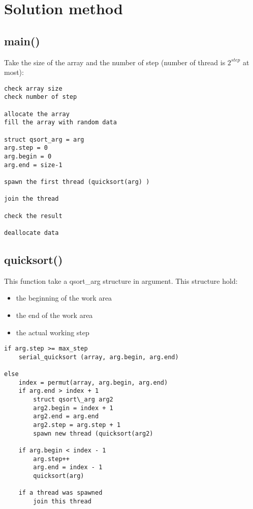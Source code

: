 \chapter{Solution method}

\section{main()}

Take the size of the array and the number of step (number of thread is $2^{step}$ at most):

\begin{verbatim}
check array size
check number of step

allocate the array
fill the array with random data

struct qsort_arg = arg
arg.step = 0
arg.begin = 0
arg.end = size-1

spawn the first thread (quicksort(arg) )

join the thread

check the result

deallocate data
\end{verbatim}

\section{quicksort()}

This function take a qsort\_arg structure in argument. This structure hold:
\begin{itemize}
  \item the beginning of the work area
  \item the end of the work area
  \item the actual working step
\end{itemize}

\begin{verbatim}
if arg.step >= max_step
    serial_quicksort (array, arg.begin, arg.end)

else
    index = permut(array, arg.begin, arg.end)
    if arg.end > index + 1
        struct qsort\_arg arg2
        arg2.begin = index + 1
        arg2.end = arg.end
        arg2.step = arg.step + 1
        spawn new thread (quicksort(arg2)

    if arg.begin < index - 1
        arg.step++
        arg.end = index - 1
        quicksort(arg)

    if a thread was spawned
        join this thread
\end{verbatim}

